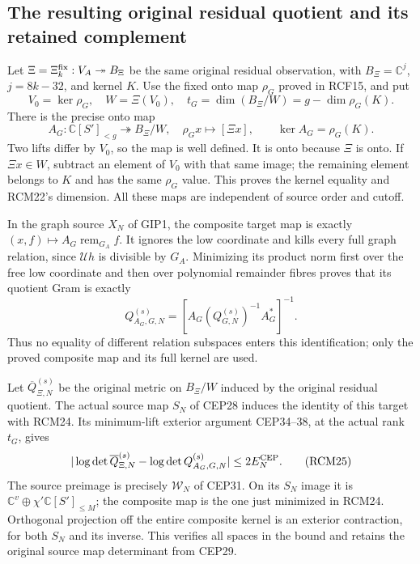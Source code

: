 \documentclass[11pt,a4paper]{article}
\begin{document}
\subsection{The resulting original residual quotient and its retained complement}

Let $\Xi=\Xi_k^{\rm fix}:V_A\twoheadrightarrow B_{\Xi}$
be the same original residual observation, with
$B_{\Xi}=\mathbb C^j$, $j=8k-32$, and kernel $K$.
Use the fixed onto map $\rho_G$ proved in RCF15, and put
\[
 V_0=\ker\rho_G,\quad W=\Xi(V_0),\quad
 t_G=\dim(B_{\Xi}/W)=g-\dim\rho_G(K).
 \tag{RCM22}
\]
There is the precise onto map
\[
 A_G:\mathbb C[S']_{<g}\twoheadrightarrow B_{\Xi}/W,
       \quad \rho_Gx\longmapsto[\Xi x],\qquad
 \ker A_G=\rho_G(K).
 \tag{RCM23}
\]
Two lifts differ by $V_0$, so the map is well defined.
It is onto because $\Xi$ is onto. If $\Xi x\in W$,
subtract an element of $V_0$ with that same image; the
remaining element belongs to $K$ and has the same $\rho_G$
value. This proves the kernel equality and RCM22's dimension.
All these maps are independent of source order and cutoff.

In the graph source $X_N$ of GIP1, the composite target map
is exactly $(x,f)\mapsto A_G\operatorname{rem}_{G_A}f$.
It ignores the low coordinate and kills every full graph
relation, since $\mathcal Uh$ is divisible by $G_A$.
Minimizing its product norm first over the free low coordinate
and then over polynomial remainder fibres proves that its
quotient Gram is exactly
\[
 Q_{A_G,G,N}^{(s)}
       =[A_G(Q_{G,N}^{(s)})^{-1}A_G^*]^{-1}.
 \tag{RCM24}
\]
Thus no equality of different relation subspaces enters this
identification; only the proved composite map and its full
kernel are used.

Let $\overline Q_{\Xi,N}^{(s)}$ be the original metric on
$B_{\Xi}/W$ induced by the original residual quotient.
The actual source map $S_N$ of CEP28 induces the identity
of this target with RCM24. Its minimum-lift exterior argument
CEP34--38, at the actual rank $t_G$, gives
\[
 |\log\det\overline Q_{\Xi,N}^{(s)}
                  -\log\det Q_{A_G,G,N}^{(s)}|
                          \le2E_N^{\rm CEP}.
 \tag{RCM25}
\]
The source preimage is precisely $\mathcal W_N$ of CEP31.
On its $S_N$ image it is $\mathbb C^v\oplus\chi'\mathbb C[S']_{\le M}$;
the composite map is the one just minimized in RCM24.
Orthogonal projection off the entire composite kernel is
an exterior contraction, for both $S_N$ and its inverse.
This verifies all spaces in the bound and retains the
original source map determinant from CEP29.
\end{document}
